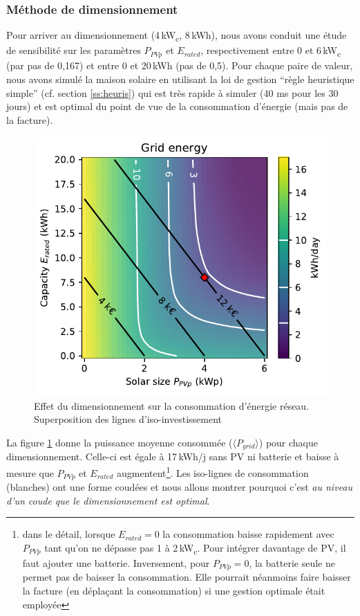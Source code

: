 \documentclass[a4paper,10pt,twocolumn]{article}
\providecommand{\avg}[1]{\langle#1\rangle}
\newcommand\sub[1]{\textsubscript{#1}}
\begin{document}
\subsubsection{Méthode de dimensionnement}

Pour arriver au dimensionnement (4\,kW\sub{c}, 8\,kWh), nous avons conduit une étude
de sensibilité sur les paramètres $P_{PVp}$ et $E_{rated}$, respectivement
entre 0 et 6\,kW\sub{c} (par pas de 0,167) et entre 0 et 20\,kWh (pas de 0,5).
Pour chaque paire de valeur, nous avons simulé la maison solaire
en utilisant la loi de gestion ``règle heuristique simple'' (cf. section \ref{ss:heuris})
qui est très rapide à simuler (40 ms pour les 30 jours) et est optimal
du point de vue de la consommation d'énergie (mais pas de la facture).


\begin{figure}[!ht]
  \begin{center}
	  \includegraphics[width=0.8\columnwidth]{figures/Sizing_E_grid_invest_heatmap.pdf}
  \end{center}

  \caption{Effet du dimensionnement sur la consommation d'énergie réseau.
  Superposition des lignes d'iso-investissement
  }
  \label{fig:P_grid_map}
\end{figure}

La figure \ref{fig:P_grid_map} donne la puissance moyenne consommée ($\avg{P_{grid}}$)
pour chaque dimensionnement. Celle-ci est égale à 17\,kWh/j sans PV ni batterie
et baisse à mesure que $P_{PVp}$ et $E_{rated}$ augmentent\footnote{
  dans le détail,
  lorsque $E_{rated}=0$ la consommation baisse rapidement avec $P_{PVp}$
  tant qu'on ne dépasse pas 1 à 2\,kW\sub{c}. Pour intégrer davantage de PV,
  il faut ajouter une batterie.
  Inversement, pour $P_{PVp}=0$, la batterie seule ne permet pas de baisser la consommation.
  Elle pourrait néanmoins faire baisser la facture (en déplaçant la consommation)
  si une gestion optimale était employée}.
Les iso-lignes de consommation (blanches) ont une forme coudées
et nous allons montrer pourquoi c'est \emph{au niveau d'un coude que le dimensionnement est optimal}.
\end{document}
